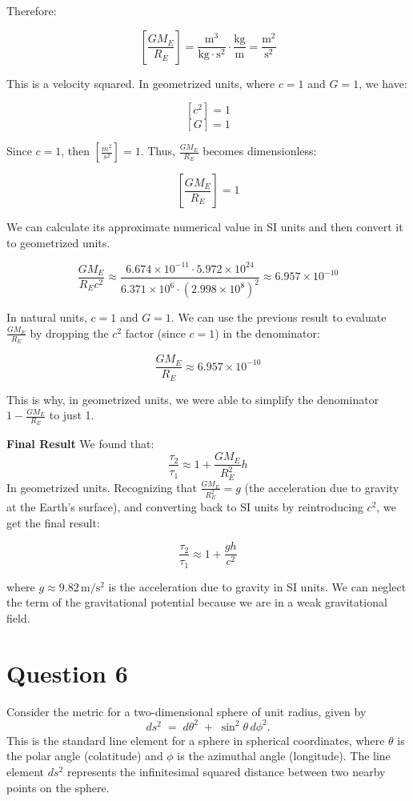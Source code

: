 \documentclass{article}
\begin{document}
Therefore:

\[
\left[\frac{GM_E}{R_E}\right] = \frac{\mathrm{m^3}}{\mathrm{kg \cdot s^2}} \cdot \frac{\mathrm{kg}}{\mathrm{m}} = \frac{\mathrm{m^2}}{\mathrm{s^2}}
\]

This is a velocity squared. In geometrized units, where \(c = 1\) and \(G = 1\), we have:

\[
[c^2] = 1
\]
\[
[G] = 1
\]

Since \(c=1\), then \(\left[\frac{m^2}{s^2}\right] = 1\). Thus, \(\frac{GM_E}{R_E}\) becomes dimensionless:

\[
\left[\frac{GM_E}{R_E}\right] = 1
\]

We can calculate its approximate numerical value in SI units and then convert it to geometrized units.

\[
\frac{GM_E}{R_E c^2} \approx \frac{6.674 \times 10^{-11} \cdot 5.972 \times 10^{24}}{6.371 \times 10^6 \cdot (2.998 \times 10^8)^2} \approx 6.957 \times 10^{-10}
\]

In natural units, \(c = 1\) and \(G = 1\). We can use the previous result to evaluate \(\frac{GM_E}{R_E}\) by dropping the \(c^2\) factor (since \(c = 1\)) in the denominator:

\[ \frac{GM_E}{R_E} \approx 6.957 \times 10^{-10} \]

This is why, in geometrized units, we were able to simplify the denominator \(1 - \frac{GM_E}{R_E}\) to just 1.

\textbf{Final Result}
We found that:
\[
\frac{\tau_2}{\tau_1} \approx 1 + \frac{GM_E}{R_E^2} h
\]
In geometrized units. Recognizing that \(\frac{GM_E}{R_E^2} = g\) (the acceleration due to gravity at the Earth's surface), and converting back to SI units by reintroducing \(c^2\), we get the final result:

\[
\frac{\tau_2}{\tau_1} \approx 1 + \frac{gh}{c^2}
\]

where \(g \approx 9.82 \, \mathrm{m/s^2}\) is the acceleration due to gravity in SI units. We can neglect the term of the gravitational potential because we are in a weak gravitational field.
\pagebreak



\section*{Question 6}
Consider the metric for a two-dimensional sphere of unit radius, given by
\[
ds^{2} \;=\; d\theta^{2} \;+\; \sin^{2}\theta\,d\phi^{2}.
\]
This is the standard line element for a sphere in spherical coordinates, where \(\theta\) is the polar angle (colatitude) and \(\phi\) is the azimuthal angle (longitude). The line element \(ds^2\) represents the infinitesimal squared distance between two nearby points on the sphere.
\end{document}
